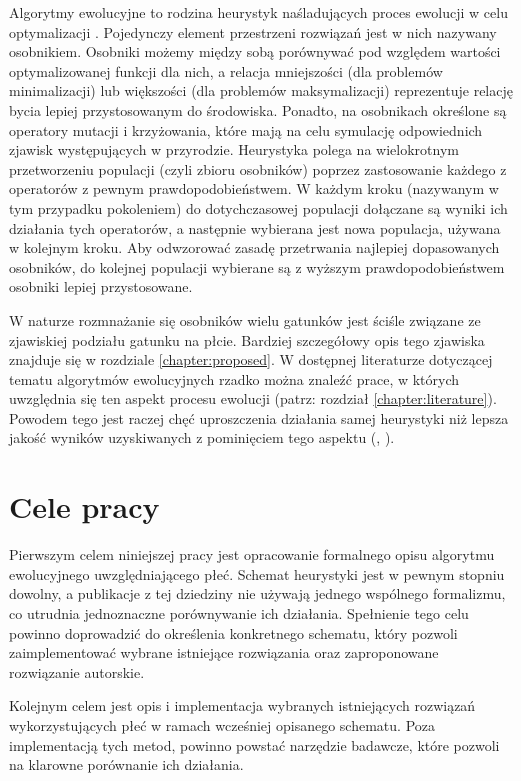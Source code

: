 \documentclass[twoside]{iisthesis}
\begin{document}
Algorytmy ewolucyjne to rodzina heurystyk naśladujących proces ewolucji w celu optymalizacji \cite{davis1991handbook}. 
Pojedynczy element przestrzeni rozwiązań jest w nich nazywany osobnikiem. 
Osobniki możemy między sobą porównywać pod względem wartości optymalizowanej funkcji dla nich, a relacja mniejszości (dla problemów minimalizacji) lub większości (dla problemów maksymalizacji) reprezentuje relację bycia lepiej przystosowanym do środowiska. 
Ponadto, na osobnikach określone są operatory mutacji i krzyżowania, które mają na celu symulację odpowiednich zjawisk występujących w przyrodzie. 
Heurystyka polega na wielokrotnym przetworzeniu populacji (czyli zbioru osobników) poprzez zastosowanie każdego z operatorów z pewnym prawdopodobieństwem. 
W każdym kroku (nazywanym w tym przypadku pokoleniem) do dotychczasowej populacji dołączane są wyniki ich działania tych operatorów, a następnie wybierana jest nowa populacja, używana w kolejnym kroku. 
Aby odwzorować zasadę przetrwania najlepiej dopasowanych osobników, do kolejnej populacji wybierane są z wyższym prawdopodobieństwem osobniki lepiej przystosowane.

W naturze rozmnażanie się osobników wielu gatunków jest ściśle związane ze zjawiskiej podziału gatunku na płcie. 
Bardziej szczegółowy opis tego zjawiska znajduje się w rozdziale \ref{chapter:proposed}. 
W dostępnej literaturze dotyczącej tematu algorytmów ewolucyjnych rzadko można znaleźć prace, w których uwzględnia się ten aspekt procesu ewolucji (patrz: rozdział \ref{chapter:literature}). 
Powodem tego jest raczej chęć uproszczenia działania samej heurystyki niż lepsza jakość wyników uzyskiwanych z pominięciem tego aspektu (\cite{GGA}, \cite{SexualGA}). 

\section{Cele pracy}

Pierwszym celem niniejszej pracy jest opracowanie formalnego opisu algorytmu ewolucyjnego uwzględniającego płeć.
Schemat heurystyki jest w pewnym stopniu dowolny, a publikacje z tej dziedziny nie używają jednego wspólnego formalizmu, co utrudnia jednoznaczne porównywanie ich działania.
Spełnienie tego celu powinno doprowadzić do określenia konkretnego schematu, który pozwoli zaimplementować wybrane istniejące rozwiązania oraz zaproponowane rozwiązanie autorskie.

Kolejnym celem jest opis i implementacja wybranych istniejących rozwiązań wykorzystujących płeć w ramach wcześniej opisanego schematu.
Poza implementacją tych metod, powinno powstać narzędzie badawcze, które pozwoli na klarowne porównanie ich działania.
\end{document}
